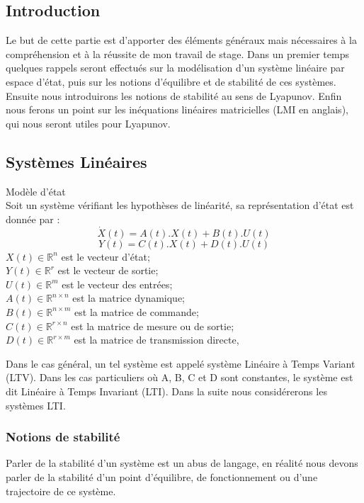 \subsection*{Introduction}
Le but de cette partie est d'apporter des éléments généraux mais nécessaires à la compréhension et à la réussite de mon travail de stage. Dans un premier temps quelques rappels seront effectués sur la modélisation d'un système linéaire par espace d'état, puis sur les notions d'équilibre et de stabilité de ces systèmes. Ensuite nous introduirons les notions de stabilité au sens de Lyapunov. Enfin nous ferons un point sur les inéquations linéaires matricielles (LMI en anglais), qui nous seront utiles pour Lyapunov. %

\subsection{Systèmes Linéaires}

\begin{definition} Modèle d'état\\
	\label{defmodeleEtat}
	Soit un système vérifiant les hypothèses de linéarité, sa représentation d'état est donnée par : 
	\[\dot{X}(t) = A(t).X(t) + B(t).U(t)\]
	\[Y(t) = C(t).X(t) + D(t).U(t)\]
	$X(t) \in \mathbb{R}^{n}$ est le vecteur d'état;\\
	$Y(t) \in \mathbb{R}^{r}$ est le vecteur de sortie;\\
	$U(t) \in \mathbb{R}^{m}$ est le vecteur des entrées;\\
	$A(t) \in \mathbb{R}^{n\times n}$ est la matrice dynamique;\\
	$B(t) \in \mathbb{R}^{n\times m}$ est la matrice de commande;\\
	$C(t) \in \mathbb{R}^{r\times n}$ est la matrice de mesure ou de sortie;\\
	$D(t) \in \mathbb{R}^{r\times m}$ est la matrice de transmission directe,
\end{definition}
Dans le cas général, un tel système est appelé système Linéaire à Temps Variant (LTV). Dans les cas particuliers où A, B, C et D sont constantes, le système est dit Linéaire à Temps Invariant (LTI).
Dans la suite nous considérerons les systèmes LTI.

\subsubsection{Notions de stabilité}
Parler de la stabilité d'un système est un abus de langage, en réalité nous devons parler de la stabilité d'un point d'équilibre, de fonctionnement ou d'une trajectoire de ce système.

